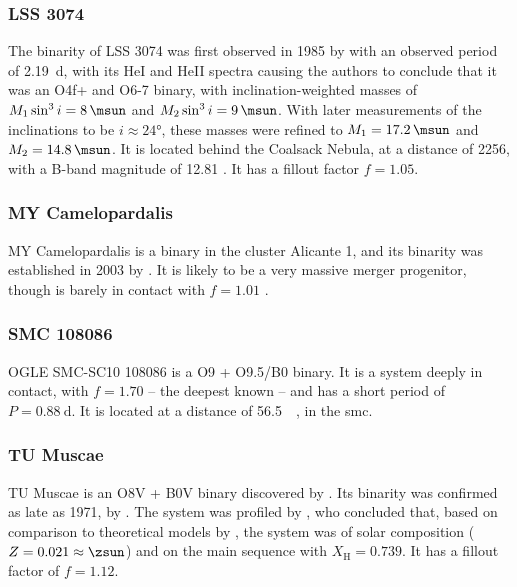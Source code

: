 \subsubsection{LSS 3074}

The binarity of LSS 3074 \citep{Raucq:2017} was first observed in 1985 by \citet{Morrell:1990} with an observed period of \SI{2.19}{\day}, with its HeI and HeII spectra causing the authors to conclude that it was an O4f+ and O6-7 binary, with inclination-weighted masses of $M_1\sin^3 i = \SI{8}{\msun}$ and $M_2\sin^3 i = \SI{9}{\msun}$. With later measurements of the inclinations to be $i\approx\ang{24}$, these masses were refined to $M_1 = \SI{17.2}{\msun}$ and $M_2=\SI{14.8}{\msun}$. It is located behind the Coalsack Nebula, at a distance of \SI{2256}{\pc}, with a B-band magnitude of \SI{12.81}{\mag} \citep{Stephenson:1971}. It has a fillout factor $f=1.05$.

\subsubsection{MY Camelopardalis}

MY Camelopardalis \citep[MY Cam;][]{Lorenzo:2014} is a binary in the cluster Alicante 1, and its binarity was established in 2003 by \citet{Negueruela:2003}. It is likely to be a very massive merger progenitor, though is barely in contact with $f=1.01$ \citep{Abdul-masih:2022}.

\subsubsection{SMC 108086}

OGLE SMC-SC10 108086 \citep[SMC 108086;][]{Hilditch:2005} is a O9 + O9.5/B0 binary. It is a system deeply in contact, with $f=1.70$ \citep{Hilditch:2005, Abdul-masih:2022} -- the deepest known -- and has a short period of $P=\SI{0.88}{\day}$. It is located at a distance of \SI{56.5}{\kilo\pc}, in the \gls{smc}.

\subsubsection{TU Muscae}

TU Muscae \citep[TU Mus;][]{Penny:2008} is an O8V + B0V binary discovered by \citet{Oosterhoff:1928, Oosterhoff:1930}. Its binarity was confirmed as late as 1971, by \citet{Knipe:1971}. The system was profiled by \citet{Andersen:1975}, who concluded that, based on comparison to theoretical models by \citet{Stothers:1972, Stothers:1973}, the system was of solar composition ($Z=0.021\approx\si{\zsun}$) and on the main sequence with $X_\text{H}=0.739$. It has a fillout factor of $f=1.12$.

